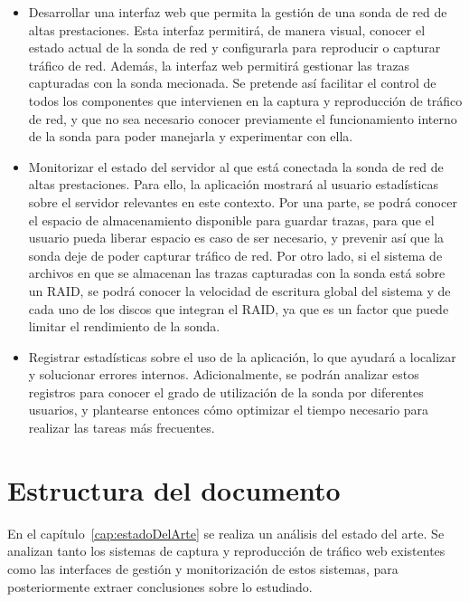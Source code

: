 \begin{itemize}
  \item Desarrollar una interfaz web que permita la gestión de una sonda de red de altas prestaciones.
  Esta interfaz permitirá, de manera visual, conocer el estado actual de la sonda de red y configurarla para reproducir o capturar tráfico de red.
  Además, la interfaz web permitirá gestionar las \glspl{traza} capturadas con la sonda mecionada.
  Se pretende así facilitar el control de todos los componentes que intervienen en la captura y reproducción de tráfico de red, y que no sea necesario conocer previamente el funcionamiento interno de la sonda para poder manejarla y experimentar con ella.

  \item Monitorizar el estado del servidor al que está conectada la sonda de red de altas prestaciones.
  Para ello, la aplicación mostrará al usuario estadísticas sobre el servidor relevantes en este contexto.
  Por una parte, se podrá conocer el espacio de almacenamiento disponible para guardar \glspl{traza}, para que el usuario pueda liberar espacio es caso de ser necesario, y prevenir así que la sonda deje de poder capturar tráfico de red.
  Por otro lado, si el sistema de archivos en que se almacenan las \glspl{traza} capturadas con la sonda está sobre un \gls{RAID}, se podrá conocer la velocidad de escritura global del sistema y de cada uno de los discos que integran el \gls{RAID}, ya que es un factor que puede limitar el rendimiento de la sonda.

  \item Registrar estadísticas sobre el uso de la aplicación, lo que ayudará a localizar y solucionar errores internos.
  Adicionalmente, se podrán analizar estos registros para conocer el grado de utilización de la sonda por diferentes usuarios, y plantearse entonces cómo optimizar el tiempo necesario para realizar las tareas más frecuentes.
\end{itemize}

\section{Estructura del documento}

En el capítulo~\ref{cap:estadoDelArte} se realiza un análisis del estado del arte. Se analizan tanto los sistemas de captura y reproducción de tráfico web existentes como las interfaces de gestión y monitorización de estos sistemas, para posteriormente extraer conclusiones sobre lo estudiado.

